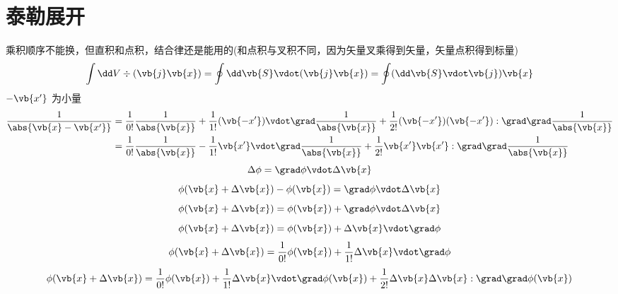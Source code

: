 \section{泰勒展开}
乘积顺序不能换，但直积和点积，结合律还是能用的(和点积与叉积不同，因为矢量叉乘得到矢量，矢量点积得到标量)
\begin{equation*}
	\int \dd V \div(\vb{j}\vb{x}) 
	= \oint \dd \vb{S} \vdot (\vb{j}\vb{x}) 
	= \oint (\dd \vb{S} \vdot \vb{j})\vb{x} 
\end{equation*}
\(- \vb{x'}\) 为小量
\begin{equation*}
	\begin{aligned}
	\frac{1}{ \abs{\vb{x} - \vb{x'}} }
	&= \frac{1}{0!} \frac{1}{\abs{\vb{x}}}
	+ \frac{1}{1!} (\vb{-x'}) \vdot \grad \frac{1}{\abs{\vb{x}}}
	+ \frac{1}{2!} (\vb{-x'}) (\vb{-x'}) : \grad\grad \frac{1}{\abs{\vb{x}}} \\
	&= \frac{1}{0!} \frac{1}{\abs{\vb{x}}}
	- \frac{1}{1!} \vb{x'} \vdot  \grad \frac{1}{\abs{\vb{x}}}
	+ \frac{1}{2!} \vb{x'}\vb{x'} : \grad\grad \frac{1}{\abs{\vb{x}}}
	\end{aligned}
\end{equation*}
\begin{equation*}
	\Delta \phi = \grad \phi \vdot \Delta \vb{x}
\end{equation*}
\begin{equation*}
	 \phi(\vb{x} + \Delta \vb{x}) - \phi(\vb{x})  = \grad \phi \vdot \Delta \vb{x}
\end{equation*}
\begin{equation*}
	 \phi(\vb{x} + \Delta \vb{x}) = \phi(\vb{x})  + \grad \phi \vdot \Delta \vb{x}
\end{equation*}
\begin{equation*}
	 \phi(\vb{x} + \Delta \vb{x}) = \phi(\vb{x})  +  \Delta \vb{x}\vdot \grad \phi
\end{equation*}
\begin{equation*}
	 \phi(\vb{x} + \Delta \vb{x}) = \frac{1}{0!} \phi(\vb{x})  + \frac{1}{1!} \Delta \vb{x}\vdot \grad \phi
\end{equation*}
\begin{equation*}
	 \phi(\vb{x} + \Delta \vb{x}) = \frac{1}{0!} \phi(\vb{x})  +
	 \frac{1}{1!} \Delta \vb{x}\vdot \grad \phi(\vb{x})
	 + \frac{1}{2!} \Delta \vb{x} \Delta \vb{x} : \grad \grad \phi(\vb{x}) 
\end{equation*}




